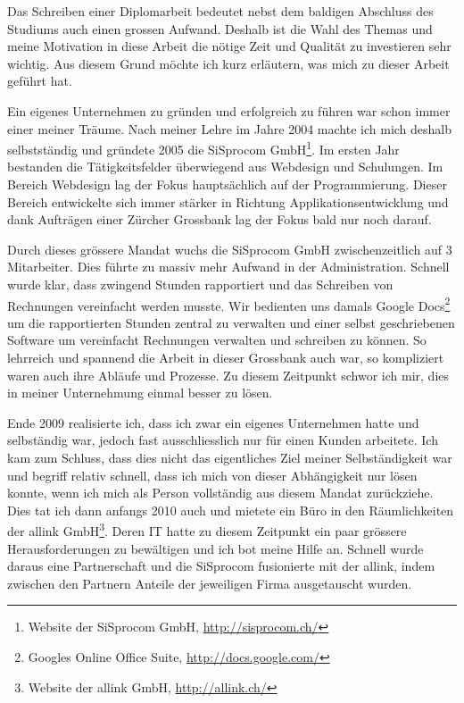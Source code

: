 Das Schreiben einer Diplomarbeit bedeutet nebst dem baldigen Abschluss des Studiums
auch einen grossen Aufwand. Deshalb ist die Wahl des Themas und meine
Motivation in diese Arbeit die nötige Zeit und Qualität zu investieren sehr
wichtig. Aus diesem Grund möchte ich kurz erläutern, was mich zu dieser
Arbeit geführt hat.

Ein eigenes Unternehmen zu gründen und erfolgreich zu führen war schon immer
einer meiner Träume. Nach meiner Lehre im Jahre 2004 machte ich mich deshalb
selbstständig und gründete 2005 die SiSprocom GmbH\footnote{Website der SiSprocom GmbH, \url{http://sisprocom.ch/}}. 
Im ersten Jahr bestanden
die Tätigkeitsfelder überwiegend aus Webdesign und Schulungen. Im Bereich
Webdesign lag der Fokus hauptsächlich auf der Programmierung. Dieser Bereich 
entwickelte sich immer stärker in Richtung 
Applikationsentwicklung und dank Aufträgen einer Zürcher Grossbank 
lag der Fokus bald nur noch darauf.

Durch dieses grössere Mandat wuchs die SiSprocom GmbH zwischenzeitlich
auf 3 Mitarbeiter. Dies führte zu massiv mehr Aufwand in der Administration.
Schnell wurde klar, dass zwingend Stunden rapportiert und das Schreiben
von Rechnungen vereinfacht werden musste. Wir bedienten uns damals Google 
Docs\footnote{Googles Online Office Suite, \url{http://docs.google.com/}} um die rapportierten Stunden zentral zu 
verwalten und einer selbst geschriebenen Software um vereinfacht Rechnungen 
verwalten und schreiben zu können.
So lehrreich und spannend die Arbeit in dieser Grossbank auch war, so kompliziert
waren auch ihre Abläufe und Prozesse. Zu diesem Zeitpunkt schwor ich mir, dies
in meiner Unternehmung einmal besser zu lösen.

Ende 2009 realisierte ich, dass ich zwar ein eigenes Unternehmen hatte und
selbständig war, jedoch fast ausschliesslich nur für einen Kunden arbeitete.
Ich kam zum Schluss, dass dies nicht das eigentliches Ziel meiner Selbständigkeit 
war und begriff
relativ schnell, dass ich mich von dieser Abhängigkeit nur lösen konnte, wenn
ich mich als Person vollständig aus diesem Mandat zurückziehe.
Dies tat ich dann anfangs 2010 auch und mietete ein Büro in den Räumlichkeiten
der allink GmbH\footnote{Website der allink GmbH, \url{http://allink.ch/}}. Deren IT hatte zu diesem Zeitpunkt 
ein paar grössere
Herausforderungen zu bewältigen und ich bot meine Hilfe an. Schnell wurde
daraus eine Partnerschaft und die SiSprocom fusionierte mit der allink, indem zwischen
den Partnern Anteile der jeweiligen Firma ausgetauscht wurden.

